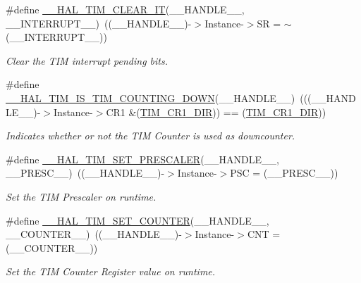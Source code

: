 \begin{DoxyCompactItemize}
\#define \hyperlink{group___t_i_m___exported___macros_gaea68155ce77e591e0c2582def061d6f0}{\+\_\+\+\_\+\+H\+A\+L\+\_\+\+T\+I\+M\+\_\+\+C\+L\+E\+A\+R\+\_\+\+IT}(\+\_\+\+\_\+\+H\+A\+N\+D\+L\+E\+\_\+\+\_\+,  \+\_\+\+\_\+\+I\+N\+T\+E\+R\+R\+U\+P\+T\+\_\+\+\_\+)~((\+\_\+\+\_\+\+H\+A\+N\+D\+L\+E\+\_\+\+\_\+)-\/$>$Instance-\/$>$SR = $\sim$(\+\_\+\+\_\+\+I\+N\+T\+E\+R\+R\+U\+P\+T\+\_\+\+\_\+))
\begin{DoxyCompactList}\small\item\em Clear the T\+IM interrupt pending bits. \end{DoxyCompactList}\item 
\#define \hyperlink{group___t_i_m___exported___macros_gac73f5e7669d92971830481e7298e98ba}{\+\_\+\+\_\+\+H\+A\+L\+\_\+\+T\+I\+M\+\_\+\+I\+S\+\_\+\+T\+I\+M\+\_\+\+C\+O\+U\+N\+T\+I\+N\+G\+\_\+\+D\+O\+WN}(\+\_\+\+\_\+\+H\+A\+N\+D\+L\+E\+\_\+\+\_\+)~(((\+\_\+\+\_\+\+H\+A\+N\+D\+L\+E\+\_\+\+\_\+)-\/$>$Instance-\/$>$C\+R1 \&(\hyperlink{group___peripheral___registers___bits___definition_gacea10770904af189f3aaeb97b45722aa}{T\+I\+M\+\_\+\+C\+R1\+\_\+\+D\+IR})) == (\hyperlink{group___peripheral___registers___bits___definition_gacea10770904af189f3aaeb97b45722aa}{T\+I\+M\+\_\+\+C\+R1\+\_\+\+D\+IR}))
\begin{DoxyCompactList}\small\item\em Indicates whether or not the T\+IM Counter is used as downcounter. \end{DoxyCompactList}\item 
\#define \hyperlink{group___t_i_m___exported___macros_gafdc5a06eab07e0c24e729fd492bdb27c}{\+\_\+\+\_\+\+H\+A\+L\+\_\+\+T\+I\+M\+\_\+\+S\+E\+T\+\_\+\+P\+R\+E\+S\+C\+A\+L\+ER}(\+\_\+\+\_\+\+H\+A\+N\+D\+L\+E\+\_\+\+\_\+,  \+\_\+\+\_\+\+P\+R\+E\+S\+C\+\_\+\+\_\+)~((\+\_\+\+\_\+\+H\+A\+N\+D\+L\+E\+\_\+\+\_\+)-\/$>$Instance-\/$>$P\+SC = (\+\_\+\+\_\+\+P\+R\+E\+S\+C\+\_\+\+\_\+))
\begin{DoxyCompactList}\small\item\em Set the T\+IM Prescaler on runtime. \end{DoxyCompactList}\item 
\#define \hyperlink{group___t_i_m___exported___macros_ga9746ac75e4cd25cec1a9ebac8cb82b97}{\+\_\+\+\_\+\+H\+A\+L\+\_\+\+T\+I\+M\+\_\+\+S\+E\+T\+\_\+\+C\+O\+U\+N\+T\+ER}(\+\_\+\+\_\+\+H\+A\+N\+D\+L\+E\+\_\+\+\_\+,  \+\_\+\+\_\+\+C\+O\+U\+N\+T\+E\+R\+\_\+\+\_\+)~((\+\_\+\+\_\+\+H\+A\+N\+D\+L\+E\+\_\+\+\_\+)-\/$>$Instance-\/$>$C\+NT = (\+\_\+\+\_\+\+C\+O\+U\+N\+T\+E\+R\+\_\+\+\_\+))
\begin{DoxyCompactList}\small\item\em Set the T\+IM Counter Register value on runtime. \end{DoxyCompactList}\item 

\end{DoxyCompactItemize}
